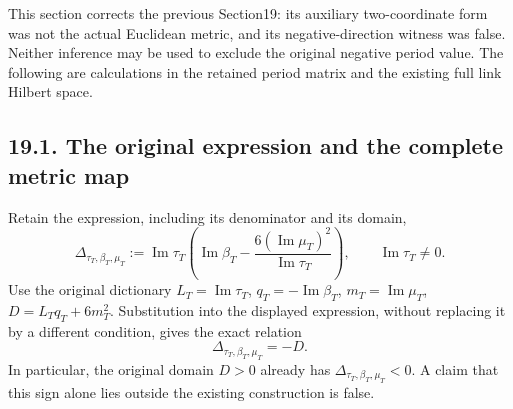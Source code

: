\documentclass[
]{article}
\begin{document}
This section corrects the previous Section19: its auxiliary
two-coordinate form was not the actual Euclidean metric, and its
negative-direction witness was false. Neither inference may be used to
exclude the original negative period value. The following are
calculations in the retained period matrix and the existing full link
Hilbert space.

\subsection{19.1. The original expression and the complete metric
map}\label{the-original-expression-and-the-complete-metric-map}

Retain the expression, including its denominator and its domain, \[
\Delta_{\tau_T,\beta_T,\mu_T}:=
\operatorname{Im}\tau_T\left(\operatorname{Im}\beta_T-
\frac{6(\operatorname{Im}\mu_T)^2}{\operatorname{Im}\tau_T}\right),
\qquad \operatorname{Im}\tau_T\ne0.
                                                               \tag{19.1}
\] Use the original dictionary \(L_T=\operatorname{Im}\tau_T\),
\(q_T=-\operatorname{Im}\beta_T\), \(m_T=\operatorname{Im}\mu_T\),
\(D=L_Tq_T+6m_T^2\). Substitution into the displayed expression, without
replacing it by a different condition, gives the exact relation \[
\Delta_{\tau_T,\beta_T,\mu_T}=-D.
                                                               \tag{19.2}
\] In particular, the original domain \(D>0\) already has
\(\Delta_{\tau_T,\beta_T,\mu_T}<0\). A claim that this sign alone lies
outside the existing construction is false.
\end{document}
